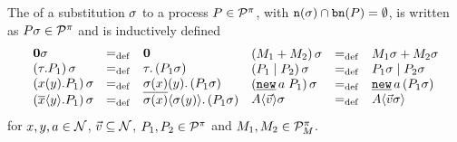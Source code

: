 \begin{definition}[Substitution]
The  of a substitution $\sigma$ to a process $P\in\mathcal P^{\pi}$, with $\mathtt{n}(\sigma)\cap\mathtt{bn}(P)=\emptyset$, is written as $P\sigma\in\mathcal P^{\pi}$ and is inductively defined
	\begin{equation*}	
		\begin{aligned}			
			\begin{array}{lcl}
				\proczero\substF & \define & \proczero \\
				\subst{\tau.P_1} & \define & \tau.\left(P_1\substF\right) \\
				\subst{\inp{x}{y}.P_1} & \define & \inp{\substF(x)}{y}.\left(P_1\substF\right) \\
				\subst{\out{x}{y}.P_1} & \define & \out{\substF(x)}{\substF(y)}.\left(P_1\substF\right)
			\end{array}
		\end{aligned}
		\begin{aligned}
			\begin{array}{lcl}
				\subst{\procchoice{M_1}{M_2}} & \define & \procchoice{M_1\substF}{M_2\substF} \\
				\subst{\procpar{P_1}{P_2}} & \define & \procpar{P_1\substF}{P_2\substF} \\
				\subst{\procres{a}{P_1}} & \define & \procres[a]{a}{P_1\substF}\\
				\proccall{A}{\vec{v}}\substF & \define & \proccall{A}{\vec{v}\substF}
			\end{array}
		\end{aligned}
	\end{equation*}
for $x,y,a\in\mathcal N$, $\vec{v}\subseteq\mathcal N$, $P_1,P_2\in\mathcal P^{\pi}$ and $M_1,M_2\in\mathcal P^{\pi}_{M}$.
\end{definition}

